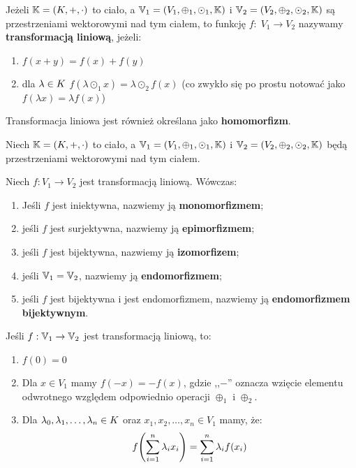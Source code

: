 \begin{definition}
Jeżeli \(\mathbb{K} = (K, +, \cdot) \) to ciało, a \(\mathbb{V}_1 = (V_1, \oplus_1, \odot_1, \mathbb{K})\) i \( \mathbb{V}_2 = (V_2, \oplus_2, \odot_2, \mathbb{K})\) są przestrzeniami wektorowymi nad tym ciałem, to funkcję \(f: \; V_1 \rightarrow V_2\) nazywamy \textbf{transformacją liniową}, jeżeli: 
\begin{enumerate}
    \item \( f(x+y) = f(x) + f(y) \)
    \item dla \( \lambda \in K \) \(f(\lambda \odot_1 x) = \lambda \odot_2 f(x)\) (co zwykło się po prostu notować jako \( f(\lambda x) = \lambda f(x) \))
\end{enumerate}

Transformacja liniowa jest również określana jako \textbf{homomorfizm}.
\end{definition}

\begin{definition}[Morfizmy]
Niech \(\mathbb{K} = (K, +, \cdot) \) to ciało, a \(\mathbb{V}_1 = (V_1, \oplus_1, \odot_1, \mathbb{K})\) i \( \mathbb{V}_2 = (V_2, \oplus_2, \odot_2, \mathbb{K})\) będą przestrzeniami wektorowymi nad tym ciałem.

Niech \(f: V_1 \rightarrow V_2\) jest transformacją liniową. Wówczas: 

\begin{enumerate}
    \item Jeśli \(f\) jest iniektywna, nazwiemy ją \textbf{monomorfizmem};
    \item jeśli \(f\) jest surjektywna, nazwiemy ją \textbf{epimorfizmem};
    \item jeśli \(f\) jest bijektywna, nazwiemy ją \textbf{izomorfizem};
    \item jeśli \(\mathbb{V}_1 = \mathbb{V}_2\), nazwiemy ją \textbf{endomorfizmem};
    \item jeśli \(f\) jest bijektywna i jest endomorfizmem, nazwiemy ją \textbf{endomorfizmem bijektywnym}.
\end{enumerate}
\end{definition}


\begin{fact}
    Jeśli \(f: \mathbb{V}_1 \rightarrow \mathbb{V}_2\) jest transformacją liniową, to:
    
    \begin{enumerate}
        \item \(f(0) = 0\)
        \item Dla \(x \in V_1\) mamy \(f(-x) = -f(x)\), gdzie ,,\(-\)'' oznacza wzięcie elementu odwrotnego względem odpowiednio operacji \(\oplus_1\) i \(\oplus_2\).
        \item Dla \(\lambda_0, \lambda_1, \dots, \lambda_n \in K\) oraz \(x_1, x_2, \dots, x_n \in V_1\) mamy, że:
        \[ 
            f\pars{\sum_{i=1}^{n} \lambda_i x_i} = \sum_{i=1}^{n} \lambda_i f(x_i)
        \]
    \end{enumerate}
\end{fact}

